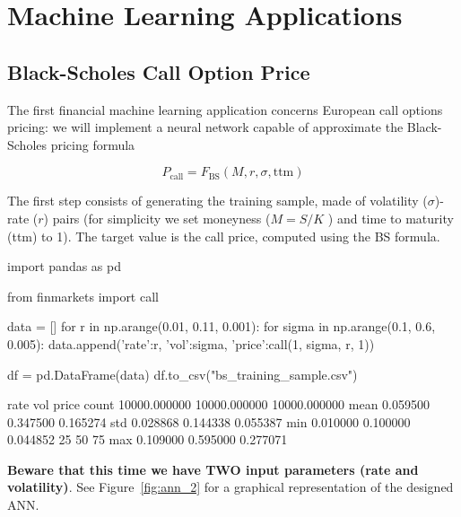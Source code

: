 \chapter{Machine Learning Applications}
\label{ch:neural-network-apps}

\section{Black-Scholes Call Option Price}
\label{black-scholes-call-options}

The first financial machine learning application concerns European call options pricing: we will implement a neural network capable of approximate the Black-Scholes pricing formula

\begin{equation} 
P_\textrm{call} = F_\textrm{BS}(M, r, \sigma, \mathrm{ttm})
\end{equation}

The first step consists of generating the training sample, made of volatility ($\sigma$)-rate ($r$) pairs (for simplicity we set moneyness ($M = S/K$ ) and time to maturity (ttm) to 1). The target value is the call price, computed using the BS formula.

\begin{ipythonnon}
import pandas as pd

from finmarkets import call

data = []
for r in np.arange(0.01, 0.11, 0.001):
    for sigma in np.arange(0.1, 0.6, 0.005):
       data.append({'rate':r, 'vol':sigma, 'price':call(1, sigma, r, 1)})

df = pd.DataFrame(data)
df.to_csv("bs_training_sample.csv")
\end{ipythonnon}
\begin{ioutput}
	rate           vol         price
	count  10000.000000  10000.000000  10000.000000
	mean       0.059500      0.347500      0.165274
	std        0.028868      0.144338      0.055387
	min        0.010000      0.100000      0.044852
	25%
	50%
	75%
	max        0.109000      0.595000      0.277071
\end{ioutput}

\textbf{Beware that this time we have TWO input parameters (rate and volatility)}. See Figure~\ref{fig:ann_2} for a graphical representation of the designed ANN.

